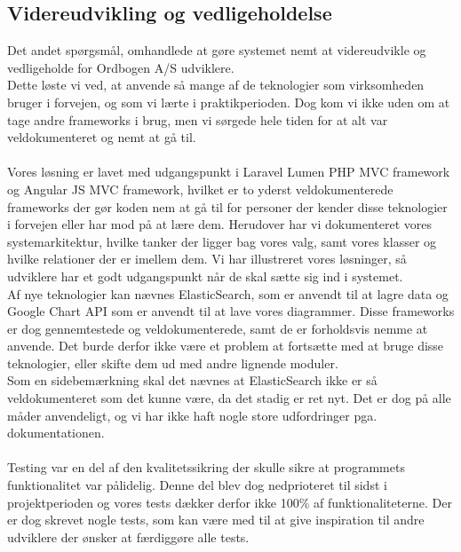 \subsection{Videreudvikling og vedligeholdelse}
Det andet spørgsmål, omhandlede at gøre systemet nemt at videreudvikle og vedligeholde for Ordbogen A/S udviklere.
\\
Dette løste vi ved, at anvende så mange af de teknologier som virksomheden bruger i forvejen, og som vi lærte i praktikperioden. Dog kom vi ikke uden om at tage andre frameworks i brug, men vi sørgede hele tiden for at alt var veldokumenteret og nemt at gå til. 
\\\\
Vores løsning er lavet med udgangspunkt i Laravel Lumen PHP MVC framework og Angular JS MVC framework, hvilket er to yderst
veldokumenterede frameworks der gør koden nem at gå til for personer der kender disse teknologier i forvejen eller har mod på at lære dem.
Herudover har vi dokumenteret vores systemarkitektur, hvilke tanker der ligger bag vores valg, samt vores klasser og hvilke relationer der er imellem dem.
Vi har illustreret vores løsninger, så udviklere har et godt udgangspunkt når de skal sætte sig ind i systemet.
\\
Af nye teknologier kan nævnes ElasticSearch, som er anvendt til at lagre data og Google Chart API som er anvendt til at lave vores diagrammer.
Disse frameworks er dog gennemtestede og veldokumenterede, samt de er forholdsvis nemme at anvende.
Det burde derfor ikke være et problem at fortsætte med at bruge disse teknologier, eller skifte dem ud med andre lignende moduler.
\\
Som en sidebemærkning skal det nævnes at ElasticSearch ikke er så veldokumenteret som det kunne være, da det stadig er ret nyt.
Det er dog på alle måder anvendeligt, og vi har ikke haft nogle store udfordringer pga. dokumentationen.
\\\\
Testing var en del af den kvalitetssikring der skulle sikre at programmets funktionalitet var pålidelig.
Denne del blev dog nedprioteret til sidst i projektperioden og vores tests dækker derfor ikke 100\% af funktionaliteterne.
Der er dog skrevet nogle tests, som kan være med til at give inspiration til andre udviklere der ønsker at færdiggøre alle tests.

